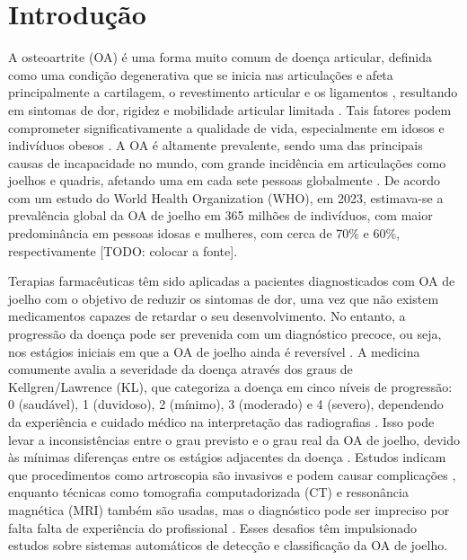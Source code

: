 
\chapter*[Introdução]{Introdução}

A osteoartrite (OA) é uma forma muito comum de doença articular, definida como uma condição degenerativa que se inicia nas articulações e afeta principalmente a cartilagem, o revestimento articular e os ligamentos \cite{Sardim2020}, resultando em sintomas de dor, rigidez e mobilidade articular limitada \cite{PACCA2018}. Tais fatores podem comprometer significativamente a qualidade de vida, especialmente em idosos e indivíduos obesos \cite{Luis2022}. A OA é altamente prevalente, sendo uma das principais causas de incapacidade no mundo, com grande incidência em articulações como joelhos e quadris, afetando uma em cada sete pessoas globalmente \cite{KELLGREN1957}. De acordo com um estudo do World Health Organization (WHO), em 2023, estimava-se a prevalência global da OA de joelho em 365 milhões de indivíduos, com maior predominância em pessoas idosas e mulheres, com cerca de 70\% e 60\%, respectivamente [TODO: colocar a fonte].

Terapias farmacêuticas têm sido aplicadas a pacientes diagnosticados com OA de joelho com o objetivo de reduzir os sintomas de dor, uma vez que não existem medicamentos capazes de retardar o seu desenvolvimento. No entanto, a progressão da doença pode ser prevenida com um diagnóstico precoce, ou seja, nos estágios iniciais em que a OA de joelho ainda é reversível \cite{Kanamoto2020}. A medicina comumente avalia a severidade da doença através dos graus de Kellgren/Lawrence (KL), que categoriza a doença em cinco níveis de progressão: 0 (saudável), 1 (duvidoso), 2 (mínimo), 3 (moderado) e 4 (severo), dependendo da experiência e cuidado médico na interpretação das radiografias \cite{KELLGREN1957}. Isso pode levar a inconsistências entre o grau previsto e o grau real da OA de joelho, devido às mínimas diferenças entre os estágios adjacentes da doença \cite{Mohammed2023}. Estudos indicam que procedimentos como artroscopia são invasivos e podem causar complicações \cite{Saraev2020}, enquanto técnicas como tomografia computadorizada (CT) e ressonância magnética (MRI) também são usadas, mas o diagnóstico pode ser impreciso por falta falta de experiência do profissional \cite{Alshamrani2023}. Esses desafios têm impulsionado estudos sobre sistemas automáticos de detecção e classificação da OA de joelho.

